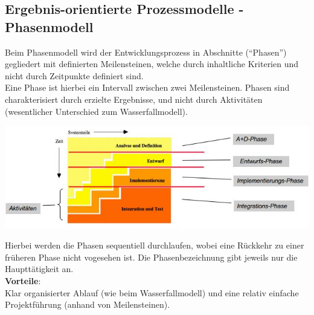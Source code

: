 \documentclass[a4paper,12pt]{article}
\begin{document}
	\subsection*{Ergebnis-orientierte Prozessmodelle - Phasenmodell}
	Beim Phasenmodell wird der Entwicklungsprozess in Abschnitte ("`Phasen"') gegliedert mit definierten Meilensteinen, welche durch inhaltliche Kriterien und nicht durch Zeitpunkte definiert sind.\\
	Eine Phase ist hierbei ein Intervall zwischen zwei Meilensteinen. Phasen sind charakterisiert durch erzielte Ergebnisse, und nicht durch Aktivitäten (wesentlicher Unterschied zum Wasserfallmodell).
	\begin{center}
		\includegraphics[width=\linewidth]{pics/phasenmodell.jpg}
	\end{center}
	Hierbei werden die Phasen sequentiell durchlaufen, wobei eine Rückkehr zu einer früheren Phase nicht vogesehen ist. Die Phasenbezeichnung gibt jeweils nur die Haupttätigkeit an.\\
	
	\textbf{Vorteile}:\\
	Klar organisierter Ablauf (wie beim Wasserfallmodell) und eine relativ einfache Projektführung (anhand von Meilensteinen).
\end{document}
